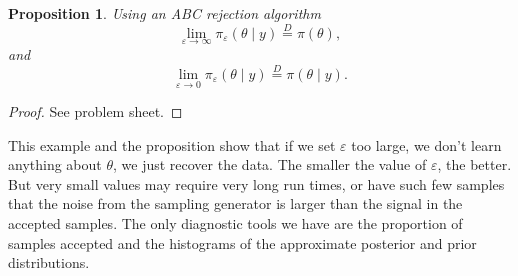 \documentclass[
]{book}
\newtheorem{proposition}{Proposition}[chapter]
\theoremstyle{definition}
\theoremstyle{definition}
\theoremstyle{definition}
\theoremstyle{definition}
\theoremstyle{remark}
\begin{document}
\begin{proposition}
Using an ABC rejection algorithm
\[
\lim_{\varepsilon \rightarrow \infty} \pi_\varepsilon(\theta \mid y) \overset{D}= \pi(\theta),
\]
and
\[
\lim_{\varepsilon \rightarrow 0} \pi_\varepsilon(\theta \mid y) \overset{D}= \pi(\theta \mid y). 
\]
\end{proposition}

\begin{proof}
See problem sheet.
\end{proof}

This example and the proposition show that if we set \(\varepsilon\) too large, we don't learn anything about \(\theta\), we just recover the data. The smaller the value of \(\varepsilon\), the better. But very small values may require very long run times, or have such few samples that the noise from the sampling generator is larger than the signal in the accepted samples. The only diagnostic tools we have are the proportion of samples accepted and the histograms of the approximate posterior and prior distributions.
\end{document}
